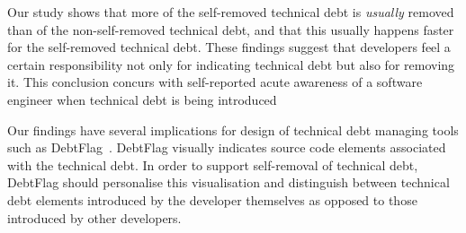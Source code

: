 
Our study shows that more of the self-removed technical debt is \emph{usually} removed than of the non-self-removed technical debt,
and that this usually happens faster for the self-removed technical debt.
These findings suggest that developers feel a certain responsibility not only for indicating technical debt but also for removing it.
This conclusion concurs with self-reported acute awareness of a software engineer when technical debt is being introduced~\cite{Wirfs-Brock}

Our findings have several implications for design of technical debt managing tools such as DebtFlag~\cite{Holvitie:Leppanen}.
DebtFlag visually indicates source code elements associated with the technical debt.
In order to support self-removal of technical debt, DebtFlag should personalise this visualisation and distinguish 
between technical debt elements introduced by the developer themselves as opposed to those introduced by other developers.


